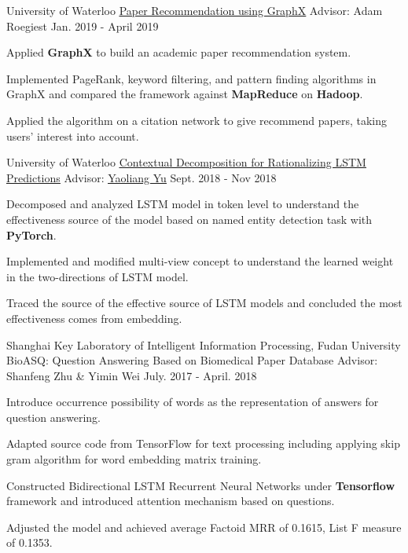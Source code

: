 \begin{cventries}
  \cventry
    {University of Waterloo}
    {{\href{https://github.com/amyxie361/CS651_Paper_recommendation}{\underline{Paper Recommendation using GraphX}}}} %
    {Advisor: Adam Roegiest} %
    {Jan. 2019 - April 2019} %
    {
      \begin{cvitems} %
        \item {Applied \textbf{GraphX} to build an academic paper recommendation system.}
        \item {Implemented PageRank, keyword filtering, and pattern finding algorithms in GraphX and compared the framework against \textbf{MapReduce} on \textbf{Hadoop}.}
        \item {Applied the algorithm on a citation network to give recommend papers, taking users’ interest into account. }
      \end{cvitems}
    }

\cventry
    {University of Waterloo}
    {{\href{https://github.com/amyxie361/CS886}{\underline{Contextual Decomposition for Rationalizing LSTM Predictions}}}} %
    {Advisor: {\href{https://cs.uwaterloo.ca/~y328yu/}{\underline{Yaoliang Yu}}}} %
    {Sept. 2018 - Nov 2018} %
    {
      \begin{cvitems} %
        \item {Decomposed and analyzed LSTM model in token level to understand the effectiveness source of the model based on named entity detection task with \textbf{PyTorch}.}
        \item {Implemented and modified multi-view concept to understand the learned weight in the two-directions of LSTM model.}
        \item {Traced the source of the effective source of LSTM models and concluded the most effectiveness comes from embedding.}
      \end{cvitems}
    }
        
      \cventry
     {Shanghai Key Laboratory of Intelligent Information Processing, Fudan University} 
    {BioASQ: Question Answering Based on Biomedical Paper Database} %
    {Advisor: Shanfeng Zhu \& Yimin Wei} %
    {July. 2017 - April. 2018} %
    {
      \begin{cvitems} %
	\item {Introduce occurrence possibility of words as the representation of answers for question answering.}
	\item {Adapted source code from TensorFlow for text processing including applying skip gram algorithm for word embedding matrix training.}
	\item {Constructed Bidirectional LSTM Recurrent Neural Networks under \textbf{Tensorflow} framework and introduced attention mechanism based on questions.}
	\item {Adjusted the model and achieved average Factoid MRR of 0.1615, List F measure of 0.1353.}
      \end{cvitems}
    }


    
\end{cventries}
